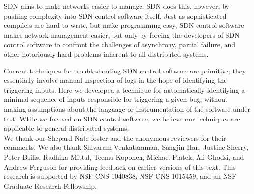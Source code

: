 
SDN aims to make networks easier to manage. SDN
does this, however, by pushing complexity into SDN control software itself. Just
as sophisticated compilers are hard to write, but make programming easy, SDN
control software makes network management easier, but only by forcing the
developers of SDN control software to confront the challenges of asynchrony,
partial failure, and other notoriously hard problems inherent to all distributed
systems.

Current techniques for troubleshooting SDN control software are primitive; they
essentially involve manual inspection of logs in the hope of identifying the
triggering inputs. Here we developed a technique for automatically
identifying a minimal sequence of inputs responsible for triggering a given
bug, without making assumptions about the language or instrumentation of the
software under test. While we focused on SDN control software, we believe our
techniques are applicable to general distributed systems. \\
%
%
%

 We thank our Shepard Nate foster and the
anonymous reviewers for their comments.
We also thank Shivaram Venkataraman, Sangjin Han, Justine Sherry, Peter Bailis, Radhika Mittal, Teemu
Koponen, Michael Piatek, Ali Ghodsi, and Andrew Ferguson for providing feedback on earlier versions of this
text. This research is supported by NSF CNS
1040838, NSF CNS 1015459, and an NSF Graduate Research Fellowship.
\vspace{-0.4em}

